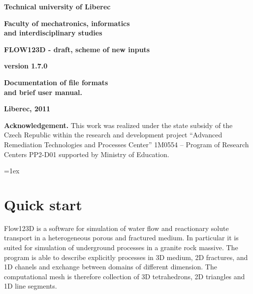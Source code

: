 \documentclass[12pt,a4paper]{report}
\begin{document}
\thispagestyle{empty}
\begin{center}
\noindent 
\textbf{\LARGE{
  Technical university of Liberec
}}

\vspace{2ex}
\textbf{\LARGE{
  Faculty of mechatronics, informatics\\
  and interdisciplinary studies
}}

\vspace{160pt}

\textbf{\Huge{
FLOW123D - draft, scheme of new inputs
}}

\vspace{1cm}
\textbf{\Large{
version 1.7.0
}}

\vspace{1cm}

\textbf{\Large{
Documentation of file formats \\
and brief user manual.
}}


\vspace{7cm}

\noindent \textbf{\Large{Liberec, 2011}}

\vspace{1cm}

{\bf Acknowledgement.} This work was realized under the state  subsidy of the Czech Republic within the research and development 
project ``Advanced Remediation Technologies and Processes Center'' 1M0554 
-- Program of Research Centers PP2-D01 supported by Ministry of Education.
\end{center}
\noindent 

\noindent

\tableofcontents
\pagebreak

\parindent=0pt
\parskip=1ex

\section{}
\chapter{Quick start}

Flow123D is a software for simulation of water flow and reactionary solute transport in a heterogeneous 
porous and fractured medium. In particular it is suited for simulation of underground processes in a granite rock massive.
The program is able to describe explicitly processes in 3D medium, 2D fractures, and 1D chanels and exchange between 
domains of different dimension. The computational mesh is therefore collection of 3D tetrahedrons, 2D triangles and 1D line segments.
\end{document}
